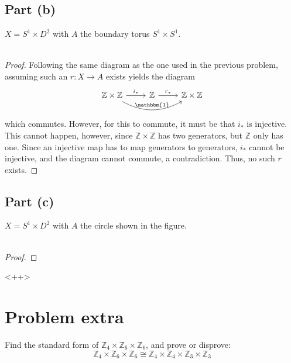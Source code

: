 \documentclass[fontsize=11pt]{scrartcl} %
\numberwithin{equation}{section} %
\numberwithin{figure}{section} %
\numberwithin{table}{section} %
\newcommand{\Z}{\mathbb{Z}}
\begin{document}
\subsection*{Part (b)}
$X=S^1\times D^2$ with $A$ the boundary torus $S^1\times S^1$.
\\
\\
\begin{proof}
    Following the same diagram as the one used in the previous problem, assuming
    such an $r:X\to A$ exists yields the diagram
    \[
\begin{tikzcd}
    \Z\times\Z\arrow{r}{i_*}\arrow[bend right]{rr}{\mathbbm{1}}
    &\Z\arrow{r}{r_*} &\Z\times \Z
\end{tikzcd}
    \]
    which commutes. However, for this to commute, it must be that $i_*$ is
    injective. This cannot happen, however, since $\Z\times \Z$ has two
    generators, but $\Z$ only has one. Since an injective map has to map
    generators to generators, $i_*$ cannot be injective, and the diagram cannot
    commute, a contradiction. Thus, no such $r$ exists.
\end{proof}
\subsection*{Part (c)}
$X=S^1\times D^2$ with $A$ the circle shown in the figure.
\\
\\
\begin{proof}
    
\end{proof}<++>

\section*{Problem extra}
Find the standard form of $\Z_4\times\Z_6\times\Z_6$, and prove or disprove:
\[
    \Z_4\times\Z_6\times\Z_6\cong \Z_4\times\Z_4\times\Z_3\times\Z_3
\]
\end{document}
